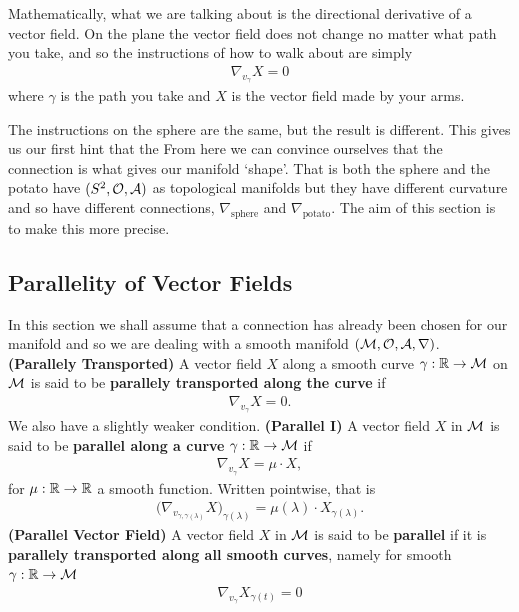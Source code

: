 \documentclass[12pt]{article} %
\newcommand{\bfs}[1]{\textbf{({#1}) }}
\begin{document}
Mathematically, what we are talking about is the directional derivative of a vector field. On the plane the vector field does not change no matter what path you take, and so the instructions of how to walk about are simply
\begin{align*}
    \nabla_{v_{\gamma}}X = 0
\end{align*}
where $\gamma$ is the path you take and $X$ is the vector field made by your arms. 

The instructions on the sphere are the same, but the result is different. This gives us our first hint that the  From here we can convince ourselves that the connection is what gives our manifold `shape'. That is both the sphere and the potato have $(S^2,\mathcal{O},\mathcal{A})$ as topological manifolds but they have different curvature and so have different connections, $\nabla_{\text{sphere}}$ and $\nabla_{\text{potato}}$. The aim of this section is to make this more precise. 

\subsection{Parallelity of Vector Fields}
In this section we shall assume that a connection has already been chosen for our manifold and so we are dealing with a smooth manifold $(\mathcal{M},\mathcal{O},\mathcal{A},\nabla)$.
\bd\bfs{Parallely Transported}\label{def:dfadfr}
    A vector field $X$ along a smooth curve $\gamma:\mathbb{R}\to\mathcal{M}$ on $\mathcal{M}$ is said to be \textbf{parallely transported along the curve} if 
    \begin{align*}
        \nabla_{v_{\gamma}}X = 0.
    \end{align*}
\ed 
We also have a slightly weaker condition.
\bd\bfs{Parallel I}
    A vector field $X$ in $\mathcal{M}$ is said to be \textbf{parallel along a curve} $\gamma:\mathbb{R}\to\mathcal{M}$ if
    \begin{align*}
        \nabla_{v_{\gamma}}X = \mu \cdot X,
    \end{align*}
    for $\mu:\mathbb{R}\to\mathbb{R}$ a smooth function. Written pointwise, that is
    \begin{align*}
        \big(\nabla_{v_{\gamma,\gamma(\lambda)}}X\big)_{\gamma(\lambda)} = \mu(\lambda) \cdot X_{\gamma(\lambda)}.
    \end{align*}
\ed 
\bd\bfs{Parallel Vector Field}\label{def:dincda}
    A vector field $X$ in $\mathcal{M}$ is said to be \textbf{parallel}  if it is \textbf{parallely transported along all smooth curves}, namely for  smooth $\gamma:\mathbb{R}\to\mathcal{M}$
    \begin{align*}
        \nabla_{v_{\gamma}}X_{\gamma(t)} = 0
    \end{align*}
\ed 
\end{document}
